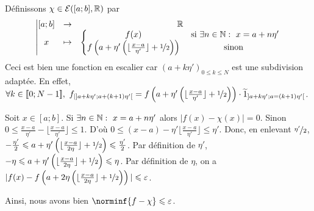 \documentclass{article}
\begin{document}
\begin{question_kholle}
		Définissons $\chi \in \mathcal{E}({[a;b]}, \mathbb R)$ par
		\begin{equation*}
			\left| \begin{matrix}
				[a;b] &\rightarrow& \mathbb R \\
				x &\mapsto& \left\{ \begin{matrix}
					f(x) &\text{ si } \exists n \in \mathbb N : \ x = a + n \eta' \\
					f\left(a + \eta' \left( \lfloor \frac{x-a}{\eta'} \rfloor + \nicefrac{1}{2} \right) \right) &\text{ sinon }
				\end{matrix} \right.
			\end{matrix} \right.
		\end{equation*}
		Ceci est bien une fonction en escalier car $(a + k \eta')_{0 \leqslant k \leqslant N}$ est une subdivision adaptée. En effet, $\forall k \in \lient 0; N-1 \rient, \ f_{|]a+k\eta';a+(k+1)\eta'[} =f\left( a + \eta' \left( \lfloor \frac{x-a}{\eta'} \rfloor + \nicefrac{1}{2} \right) \right) \cdot \widetilde{1}_{]a+k\eta';a=(k+1)\eta'[}$.
		
		Soit $x \in [a; b]$.
		Si $\exists n \in \mathbb N : \ x = a + n \eta'$ alors $|f(x) - \chi(x)| = 0$.
		Sinon $0 \leqslant \frac{x - a} {\eta'} - \lfloor \frac{x-a}{\eta'} \rfloor \leqslant 1$.
		D'où $0 \leqslant (x - a) - \eta' \lfloor \frac{x-a}{\eta'} \rfloor \leqslant \eta'$.
		Donc, en enlevant $\nicefrac{\eta'}{2}$, $- \frac{\eta'}{2} \leqslant a + \eta' \left( \lfloor \frac{x-a}{2 \eta} \rfloor + \nicefrac{1}{2} \right) \leqslant \frac{\eta'}{2}$.
		Par définition de $\eta'$, \ $- \eta \leqslant a + \eta' \left( \lfloor \frac{x-a}{2 \eta} \rfloor + \nicefrac{1}{2} \right) \leqslant \eta$.
		Par définition de $\eta$, on a $|f(x) - f\left(a + 2 \eta \left( \lfloor \frac{x-a}{2 \eta} \rfloor + \nicefrac{1}{2} \right) \right)| \leqslant \varepsilon$.
		
		Ainsi, nous avons bien $\norminf{f - \chi} \leqslant \varepsilon$.
		\bigbreak
		

\end{question_kholle}
\end{document}
